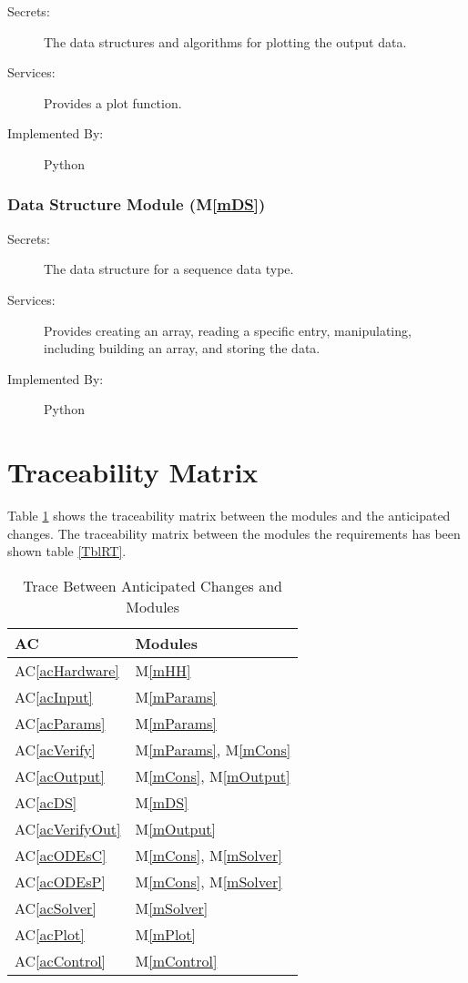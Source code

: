 \documentclass[12pt, titlepage]{article}
\newcommand{\acref}[1]{AC\ref{#1}}
\newcommand{\mref}[1]{M\ref{#1}}
\begin{document}
\begin{description}
\item[Secrets:] The data structures and algorithms for plotting the output data.
\item[Services:] Provides a plot function.
\item[Implemented By:] Python
\end{description}

\subsubsection{ Data Structure Module (\mref{mDS})}

\begin{description}
\item[Secrets:] The data structure for a sequence data type.
\item[Services:] Provides creating an array, reading a specific entry, manipulating, including building an array, and storing the data.
\item[Implemented By:] Python
\end{description}

\section{Traceability Matrix} \label{SecTM}

Table \ref{TblACT} shows the traceability matrix between the modules and the anticipated changes.
The traceability matrix between the modules the
requirements has been shown table \ref{TblRT}.



\begin{table}[H]
\centering
\begin{tabular}{p{} p{}}
\toprule
\textbf{AC} & \textbf{Modules}\\
\midrule
\acref{acHardware} & \mref{mHH}\\
\acref{acInput} & \mref{mParams}\\
\acref{acParams} &\mref{mParams}\\
\acref{acVerify} & \mref{mParams}, \mref{mCons}\\
\acref{acOutput} & \mref{mCons}, \mref{mOutput}\\
\acref{acDS} & \mref{mDS}\\
\acref{acVerifyOut} & \mref{mOutput}\\
\acref{acODEsC} & \mref{mCons}, \mref{mSolver}\\
\acref{acODEsP} &  \mref{mCons}, \mref{mSolver}\\
\acref{acSolver} & \mref{mSolver}\\
\acref{acPlot} & \mref{mPlot}\\
\acref{acControl} & \mref{mControl}\\
\bottomrule
\end{tabular}
\caption{Trace Between Anticipated Changes and Modules}
\label{TblACT}
\end{table}
\end{document}
